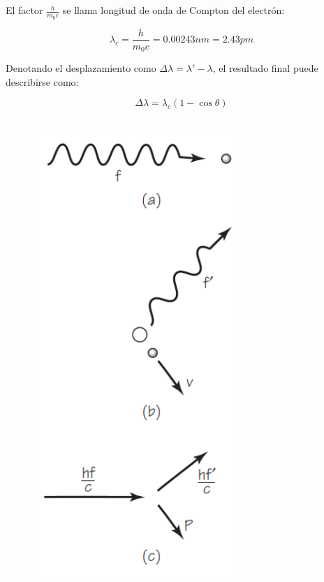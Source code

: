 \documentclass[letterpaper, 12pt]{article}
\begin{document}
\subsection{}

\subsection{\cite{Moebs_2021}}

El factor $\frac{h}{m_{0} c}$ se llama longitud de onda de
Compton del electrón:

\begin{equation}
      \lambda_{c} = \frac{h}{m_{0} c} = 0.00243 nm = 2.43 pm
\end{equation}

Denotando el desplazamiento como $\Delta \lambda = \lambda'
      - \lambda$, el resultado final puede describirse como:

\begin{equation}
      \Delta \lambda = \lambda_{c} (1 - \cos\theta)
\end{equation}

\subsection{\cite{Tomé_2019}}

\begin{figure}
      \begin{center}
            \includegraphics[width=.3\textwidth]{Images/Imagen_4.png}
      \end{center}
\end{figure}
\end{document}
